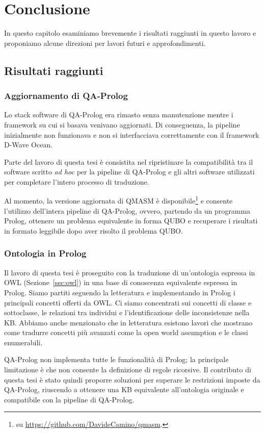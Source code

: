 \chapter{Conclusione}
\label{ch:conclusion}
In questo capitolo esaminiamo brevemente i risultati raggiunti in questo lavoro e proponiamo alcune direzioni per lavori futuri e approfondimenti.

\section{Risultati raggiunti}
\subsection{Aggiornamento di QA-Prolog}
Lo stack software di QA-Prolog era rimasto senza manutenzione mentre i framework su cui si basava venivano aggiornati. Di conseguenza, la pipeline inizialmente non funzionava e non si interfacciava correttamente con il framework D-Wave Ocean.

Parte del lavoro di questa tesi è consistita nel ripristinare la compatibilità tra il software scritto \textit{ad hoc} per la pipeline di QA-Prolog e gli altri software utilizzati per completare l'intero processo di traduzione.

Al momento, la versione aggiornata di QMASM è disponibile\footnote{su \url{https://github.com/DavideCamino/qmasm}.} e consente l'utilizzo dell'intera pipeline di QA-Prolog, ovvero, partendo da un programma Prolog, ottenere un problema equivalente in forma QUBO e recuperare i risultati in formato leggibile dopo aver risolto il problema QUBO.

\subsection{Ontologia in Prolog}
Il lavoro di questa tesi è proseguito con la traduzione di un'ontologia espressa in OWL (Sezione~\ref{sec:owl}) in una base di conoscenza equivalente espressa in Prolog. Siamo partiti seguendo la letteratura e implementando in Prolog i principali concetti offerti da OWL. Ci siamo concentrati sui concetti di classe e sottoclasse, le relazioni tra individui e l'identificazione delle inconsistenze nella KB. Abbiamo anche menzionato che in letteratura esistono lavori che mostrano come tradurre concetti più avanzati come la open world assumption e le classi enumerabili.

QA-Prolog non implementa tutte le funzionalità di Prolog; la principale limitazione è che non consente la definizione di regole ricorsive. Il contributo di questa tesi è stato quindi proporre soluzioni per superare le restrizioni imposte da QA-Prolog, riuscendo a ottenere una KB equivalente all'ontologia originale e compatibile con la pipeline di QA-Prolog.

